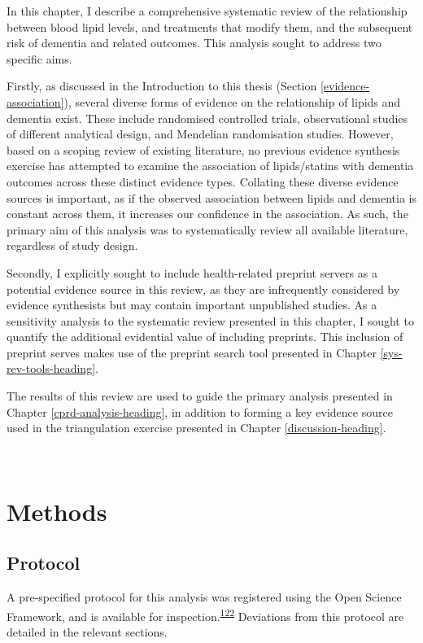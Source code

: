 \documentclass[a4paper, twoside]{templates/ociamthesis}
\begin{document}
In this chapter, I describe a comprehensive systematic review of the relationship between blood lipid levels, and treatments that modify them, and the subsequent risk of dementia and related outcomes. This analysis sought to address two specific aims.

Firstly, as discussed in the Introduction to this thesis (Section \ref{evidence-association}), several diverse forms of evidence on the relationship of lipids and dementia exist. These include randomised controlled trials, observational studies of different analytical design, and Mendelian randomisation studies. However, based on a scoping review of existing literature, no previous evidence synthesis exercise has attempted to examine the association of lipids/statins with dementia outcomes across these distinct evidence types. Collating these diverse evidence sources is important, as if the observed association between lipids and dementia is constant across them, it increases our confidence in the association. As such, the primary aim of this analysis was to systematically review all available literature, regardless of study design.

Secondly, I explicitly sought to include health-related preprint servers as a potential evidence source in this review, as they are infrequently considered by evidence synthesists but may contain important unpublished studies. As a sensitivity analysis to the systematic review presented in this chapter, I sought to quantify the additional evidential value of including preprints. This inclusion of preprint serves makes use of the preprint search tool presented in Chapter \ref{sys-rev-tools-heading}.

The results of this review are used to guide the primary analysis presented in Chapter \ref{cprd-analysis-heading}, in addition to forming a key evidence source used in the triangulation exercise presented in Chapter \ref{discussion-heading}.

~

\hypertarget{methods}{%
\section{Methods}\label{methods}}

\hypertarget{protocol}{%
\subsection{Protocol}\label{protocol}}

A pre-specified protocol for this analysis was registered using the Open Science Framework, and is available for inspection.\textsuperscript{\protect\hyperlink{ref-mcguinnessluke2020}{122}} Deviations from this protocol are detailed in the relevant sections.
\end{document}
